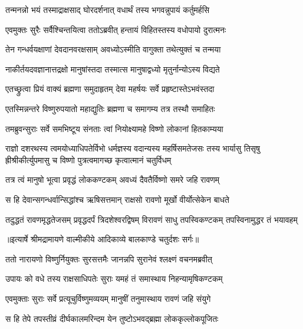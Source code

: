 \twolineshloka
{तन्मनन्नो भयं तस्माद्राक्षसाद् घोरदर्शनात्}
{वधार्थं तस्य भगवन्नुपायं कर्तुमर्हसि} %

\twolineshloka
{एवमुक्तः सुरैः सर्वैश्चिन्तयित्वा ततोऽब्रवीत्}
{हन्तायं विहितस्तस्य वधोपायो दुरात्मनः} %

\twolineshloka
{तेन गन्धर्वयक्षाणां देवदानवरक्षसाम्}
{अवध्योऽस्मीति वागुक्ता तथेत्युक्तं च तन्मया} %

\twolineshloka
{नाकीर्तयदवज्ञानात्तद्रक्षो मानुषांस्तदा}
{तस्मात्स मानुषाद्वध्यो मृतुर्नान्योऽस्य विद्यते} %

\twolineshloka
{एतच्छ्रुत्वा प्रियं वाक्यं ब्रह्मणा समुदाहृतम्}
{देवा महर्षयः सर्वे प्रहृष्टास्तेऽभवंस्तदा} %

\twolineshloka
{एतस्मिन्नन्तरे विष्णुरुपयातो महाद्युतिः}
{ब्रह्मणा च समागम्य तत्र तस्थौ समाहितः} %

\twolineshloka
{तमब्रुवन्सुराः सर्वे समभिष्टूय संनताः}
{त्वां नियोक्ष्यामहे विष्णो लोकानां हितकाम्यया} %

\fourlineshloka
{राज्ञो दशरथस्य त्वमयोध्याधिपतेर्विभो}
{धर्मज्ञस्य वदान्यस्य महर्षिसमतेजसः}
{तस्य भार्यासु तिसृषु ह्रीश्रीकीर्त्युपमासु च}
{विष्णो पुत्रत्वमागच्छ कृत्वात्मानं चतुर्विधम्} %

\twolineshloka
{तत्र त्वं मानुषो भूत्वा प्रवृद्धं लोककण्टकम्}
{अवध्यं दैवतैर्विष्णो समरे जहि रावणम्} %

\twolineshloka
{स हि देवान्सगन्धर्वान्सिद्धांश्च ऋषिसत्तमान्}
{राक्षसो रावणो मूर्खो वीर्योत्सेकेन बाधते} %

\fourlineindentedshloka
{तदुद्धतं रावणमृद्धतेजसम्}
{प्रवृद्धदर्पं त्रिदशेश्वरद्विषम्}
{विरावणं साधु तपस्विकण्टकम्}
{तपस्विनामुद्धर तं भयावहम्} %


{॥इत्यार्षे श्रीमद्रामायणे वाल्मीकीये आदिकाव्ये बालकाण्डे चतुर्दशः सर्गः॥}


\twolineshloka
{ततो नारायणो विष्णुर्नियुक्तः सुरसत्तमैः}
{जानन्नपि सुरानेवं श्लक्ष्णं वचनमब्रवीत्} %

\twolineshloka
{उपायः को वधे तस्य राक्षसाधिपतेः सुराः}
{यमहं तं समास्थाय निहन्यामृषिकण्टकम्} %

\twolineshloka
{एवमुक्ताः सुराः सर्वे प्रत्यूचुर्विष्णुमव्ययम्}
{मानुषीं तनुमास्थाय रावणं जहि संयुगे} %

\twolineshloka
{स हि तेपे तपस्तीव्रं दीर्घकालमरिन्दम}
{येन तुष्टोऽभवद्ब्रह्मा लोककृल्लोकपूजितः} %

